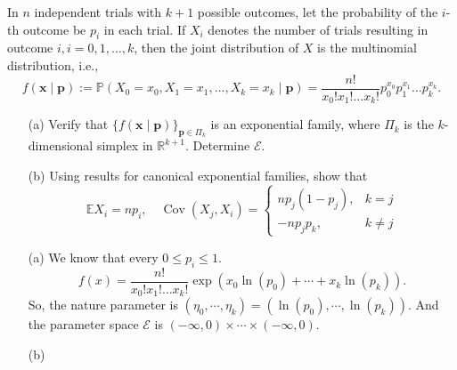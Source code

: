 \documentclass[12pt]{article}
\begin{document}
    \begin{exercise}
        In \(n\) independent trials with \(k+1\) possible outcomes, let the probability of the \(i\)-th outcome be \(p_{i}\) in each trial. If \(X_{i}\) denotes the number of trials resulting in outcome \(i, i=0,1, \ldots, k\), then the joint distribution of \(X\) is the multinomial distribution, i.e., 
        \[
            f(\mathbf{x} \mid \mathbf{p}):=\mathbb{P}\left(X_{0}=x_{0}, X_{1}=x_{1}, \ldots, X_{k}=x_{k} \mid \mathbf{p}\right)=\frac{n !}{x_{0} ! x_{1} ! \ldots x_{k} !} p_{0}^{x_{0}} p_{1}^{x_{1}} \ldots p_{k}^{x_{k}}. 
        \]
        \begin{itemize}
            \item[(a)] Verify that \(\{f(\mathbf{x} \mid \mathbf{p})\}_{\mathbf{p} \in \Pi_{k}}\) is an exponential family, where \(\Pi_{k}\) is the \(k\)-dimensional simplex in \(\mathbb{R}^{k+1}\). Determine \(\mathcal{E}\). 
            \item[(b)] Using results for canonical exponential families, show that
            \[
                \mathbb{E} X_{i}=n p_{i}, \quad \operatorname{Cov}\left(X_{j}, X_{i}\right)=\left\{\begin{array}{cc}
                n p_{j}\left(1-p_{j}\right), & k=j \\
                -n p_{j} p_{k}, & k \neq j
            \end{array}\right.
            \]
        \end{itemize}
    \end{exercise}

    \begin{solution}
        \begin{itemize}
            \item[(a)] We know that every \(0\leqslant p_i\leqslant 1\). 
            \[
                f(x)=\frac{n !}{x_{0} ! x_{1} ! \ldots x_{k} !} \exp\left(x_0\ln (p_0)+\cdots+x_k\ln (p_k)\right). 
            \]
            So, the nature parameter is $(\eta_0,\cdots,\eta_k)=(\ln(p_0),\cdots,\ln(p_k))$. And the parameter space \(\mathcal{E}\) is \((-\infty,0)\times\cdots\times(-\infty,0)\). 
            \item[(b)] 
        \end{itemize}
    \end{solution}
\end{document}
